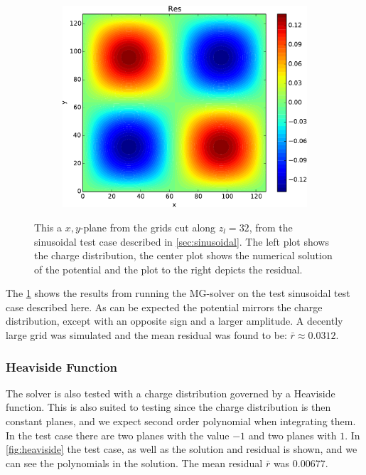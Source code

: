 \begin{figure}
\begin{subfigure}[b]{0.32\textwidth}
				\includegraphics[width = \textwidth]{figures/verification/analytical/sinusoidal/residual.pdf}
			\end{subfigure}
		\caption{This a \(x,y\)-plane from the grids cut along \(z_l = 32\), from the sinusoidal test case described in \cref{sec:sinusoidal}.
		The left plot shows the charge distribution, the center plot shows the numerical solution of the potential and the plot to the right depicts
		the residual.}
		\label{fig:sinusoidal}
	\end{figure}

	The \cref{fig:sinusoidal} shows the results from running the MG-solver on the test sinusoidal test case described here.
	As can be expected the potential mirrors the charge distribution, except with an opposite sign and a larger amplitude.
	A decently large grid was simulated and the mean residual was found to be: \(\bar{r} \approx 0.0312\).


	\subsubsection{Heaviside Function}
		The solver is also tested with a charge distribution governed by a Heaviside
		function. This is also suited to testing since the charge distribution is then
		constant planes, and we expect second order polynomial when integrating them.
		In the test case there are two planes with the value \(-1\) and two
		planes with \(1\). In \cref{fig:heaviside} the test case, as well as the solution and residual is
		shown, and we can see the polynomials in the solution. The mean residual \(\bar{r}\) was
		\(0.00677\).

